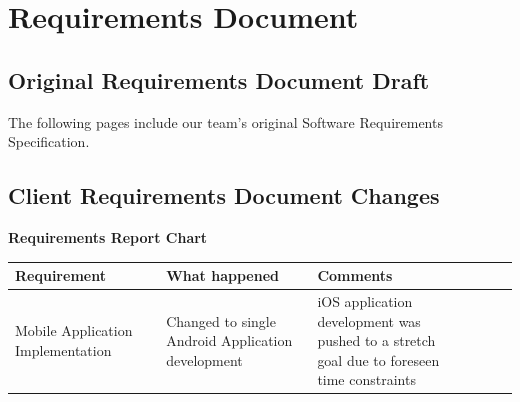 \documentclass[onecolumn, draftclsnofoot,10pt, compsoc]{IEEEtran}
\begin{document}
\newpage
\section{Requirements Document}
\subsection{Original Requirements Document Draft}
\vspace{2cm}\hspace{2.4cm}
\noindent The following pages include our team's original Software Requirements Specification.
\\
 

\subsection{Client Requirements Document Changes}
\begin{center}
\textbf{Requirements Report Chart}
\vspace{0.3cm}

\begin{tabular}
{| p{0.3\linewidth}| p{0.3\linewidth} | p{0.3\linewidth} | p{0.3\linewidth} |}


\hline Requirement&What happened&Comments\\


\hline 
Mobile Application Implementation
&
Changed to single Android Application development
&
iOS application development was pushed to a stretch goal due to foreseen time constraints
\\
\hline



\end{tabular}
\end{center}
\end{document}
